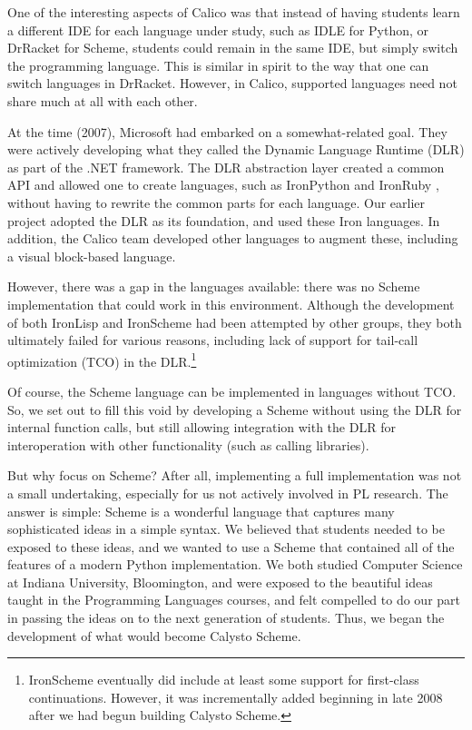 \documentclass[acmsmall,screen,authorversion]{acmart}
\begin{document}
One of the interesting aspects of Calico was that instead of having
students learn a different IDE for each language under study, such as
IDLE for Python, or DrRacket for Scheme, students could remain in the
same IDE, but simply switch the programming language. This is similar
in spirit to the way that one can switch languages in
DrRacket. However, in Calico, supported languages need not share much
at all with each other.

At the time (2007), Microsoft had embarked on a somewhat-related goal. They
were actively developing what they called the Dynamic Language Runtime (DLR) as
part of the .NET framework. The DLR abstraction layer created a common API and
allowed one to create languages, such as IronPython and IronRuby
\cite{IronRuby}, without having to rewrite the common parts for each
language. Our earlier project adopted the DLR as its foundation, and used these
Iron languages. In addition, the Calico team developed other languages to
augment these, including a visual block-based language.

However, there was a gap in the languages available: there was no
Scheme implementation that could work in this environment. Although
the development of both IronLisp and IronScheme \cite{IronScheme} had
been attempted by other groups, they both ultimately failed for
various reasons, including lack of support for tail-call optimization
(TCO) in the DLR.\footnote[1]{IronScheme eventually did include at
least some support for first-class continuations. However, it was
incrementally added beginning in late 2008
\cite{IronScheme-Continuations} after we had begun building Calysto
Scheme.}

Of course, the Scheme language can be implemented in languages without
TCO. So, we set out to fill this void by developing a Scheme without
using the DLR for internal function calls, but still allowing
integration with the DLR for interoperation with other functionality
(such as calling libraries).


But why focus on Scheme? After all, implementing a full implementation
was not a small undertaking, especially for us not actively involved
in PL research. The answer is simple: Scheme is a wonderful language
that captures many sophisticated ideas in a simple syntax. We believed
that students needed to be exposed to these ideas, and we wanted to
use a Scheme that contained all of the features of a modern Python
implementation. We both studied Computer Science at Indiana
University, Bloomington, and were exposed to the beautiful ideas
taught in the Programming Languages courses, and felt compelled to do
our part in passing the ideas on to the next generation of
students. Thus, we began the development of what would become Calysto
Scheme.
\end{document}
